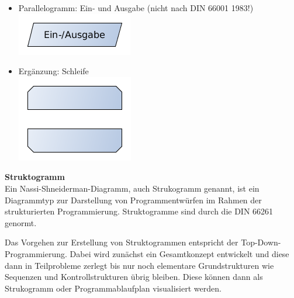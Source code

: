 \begin{itemize}
	\item Parallelogramm: Ein- und Ausgabe (nicht nach DIN 66001 1983!)\\
		\includegraphics[scale=0.5]{pictures/lf06prog-pic/lf06prog-pap-ein-ausgabe.png}	
	\item Ergänzung: Schleife\\
		\includegraphics[scale=0.5]{pictures/lf06prog-pic/lf06prog-pap-schleife.png}
\end{itemize}

{\bf Struktogramm}~\\

Ein Nassi-Shneiderman-Diagramm, auch Strukogramm genannt, ist ein Diagrammtyp zur Darstellung von Programmentwürfen im Rahmen der strukturierten Programmierung. Struktogramme sind durch die DIN 66261 genormt.

Das Vorgehen zur Erstellung von Struktogrammen entspricht der Top-Down-Programmierung. Dabei wird zunächst ein Gesamtkonzept entwickelt und diese dann in Teilprobleme zerlegt bis nur noch elementare Grundstrukturen wie Sequenzen und Kontrollstrukturen übrig bleiben. Diese können dann als Strukogramm oder Programmablaufplan visualisiert werden.

